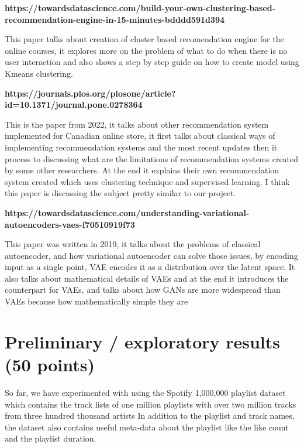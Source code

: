 \documentclass{article}
\begin{document}
\textbf{https://towardsdatascience.com/build-your-own-clustering-based-recommendation-engine-in-15-minutes-bdddd591d394}

This paper talks about creation of cluster based recomendation engine for the online courses, it explores more on the problem of what to do when there is no user interaction and also shows a step by step guide on how to create model using Kmeans clustering.

\textbf{https://journals.plos.org/plosone/article?id=10.1371/journal.pone.0278364}

This is the paper from 2022, it talks about other recommendation system implemented for Canadian online store, it first talks about classical ways of implementing recommendation systems and the most recent updates then it process to discussing what are the limitations of recommendation systems created by some other researchers. At the end it explains their own recommendation system created which uses clustering technique and supervised learning. I think this paper is discussing the subject pretty similar to our project.

\textbf{https://towardsdatascience.com/understanding-variational-autoencoders-vaes-f70510919f73}

This paper was written in 2019, it talks about the problems of classical autoencoder, and how variational autoencoder can solve those issues, by encoding input as a single point, VAE encodes it as a distribution over the latent space. It also talks about mathematical details of VAEs and at the end it introduces the counterpart for VAEs, and talks about  how GANs are more widespread than VAEs because how mathematically simple they are
\section{Preliminary / exploratory results (50 points)}

So far, we have experimented with using the Spotify 1,000,000 playlist dataset which contains the track lists of one million playlists with over two million tracks from three hundred thousand artists
In addition to the playlist and track names, the dataset also contains useful meta-data about the playlist like the like count and the playlist duration. \\ \\
\end{document}
